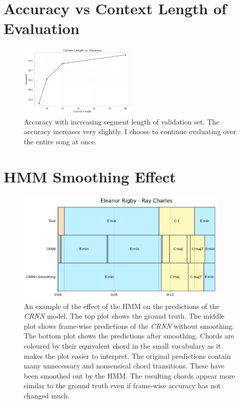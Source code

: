 \section{Accuracy vs Context Length of Evaluation}\label{app:accuracy_vs_context_length}

\begin{figure}[H]
    \centering
    \includegraphics[width=0.5\textwidth]{figures/context_length_vs_accuracy.png}
    \caption{Accuracy with increasing segment length of validation set. The accuracy increases very slightly. I choose to continue evaluating over the entire song at once.}
    \label{fig:accuracy_vs_context_length}
\end{figure}

\section{HMM Smoothing Effect}\label{app:hmm_smoothing_effect}

\begin{figure}[H]
    \centering
    \includegraphics[width=0.9\textwidth]{figures/hmm_smoothing_example.png}
    \caption{An example of the effect of the HMM on the predictions of the \emph{CRNN} model. The top plot shows the ground truth. The middle plot shows frame-wise predictions of the \emph{CRNN} without smoothing. The bottom plot shows the predictions after smoothing. Chords are coloured by their equivalent chord in the small vocabulary as it makes the plot easier to interpret. The original predictions contain many unnecessary and nonsensical chord transitions. These have been smoothed out by the HMM. The resulting chords appear more similar to the ground truth even if frame-wise accuracy has not changed much.}\label{fig:hmm_smoothing_example}
\end{figure}

